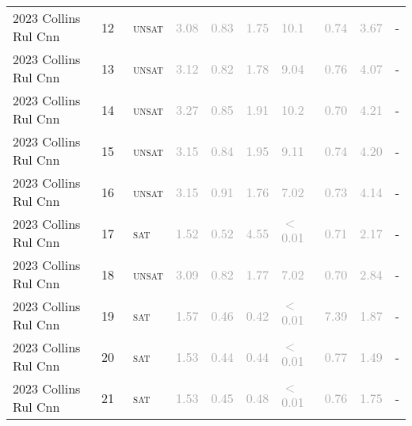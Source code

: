 \begin{center}
{\begin{longtable}{@{}llllllllll@{}}
2023 Collins Rul Cnn & 12 & ~\textsc{unsat} & \textcolor{darkgray}{3.08} & \textcolor{darkgray}{0.83} & \textcolor{darkgray}{1.75} & \textcolor{darkgray}{10.1} & \textcolor{darkgray}{0.74} & \textcolor{darkgray}{3.67} & - \\
2023 Collins Rul Cnn & 13 & ~\textsc{unsat} & \textcolor{darkgray}{3.12} & \textcolor{darkgray}{0.82} & \textcolor{darkgray}{1.78} & \textcolor{darkgray}{9.04} & \textcolor{darkgray}{0.76} & \textcolor{darkgray}{4.07} & - \\
2023 Collins Rul Cnn & 14 & ~\textsc{unsat} & \textcolor{darkgray}{3.27} & \textcolor{darkgray}{0.85} & \textcolor{darkgray}{1.91} & \textcolor{darkgray}{10.2} & \textcolor{darkgray}{0.70} & \textcolor{darkgray}{4.21} & - \\
2023 Collins Rul Cnn & 15 & ~\textsc{unsat} & \textcolor{darkgray}{3.15} & \textcolor{darkgray}{0.84} & \textcolor{darkgray}{1.95} & \textcolor{darkgray}{9.11} & \textcolor{darkgray}{0.74} & \textcolor{darkgray}{4.20} & - \\
2023 Collins Rul Cnn & 16 & ~\textsc{unsat} & \textcolor{darkgray}{3.15} & \textcolor{darkgray}{0.91} & \textcolor{darkgray}{1.76} & \textcolor{darkgray}{7.02} & \textcolor{darkgray}{0.73} & \textcolor{darkgray}{4.14} & - \\
2023 Collins Rul Cnn & 17 & ~\textsc{sat} & \textcolor{darkgray}{1.52} & \textcolor{darkgray}{0.52} & \textcolor{darkgray}{4.55} & \textcolor{darkgray}{$<$0.01} & \textcolor{darkgray}{0.71} & \textcolor{darkgray}{2.17} & - \\
2023 Collins Rul Cnn & 18 & ~\textsc{unsat} & \textcolor{darkgray}{3.09} & \textcolor{darkgray}{0.82} & \textcolor{darkgray}{1.77} & \textcolor{darkgray}{7.02} & \textcolor{darkgray}{0.70} & \textcolor{darkgray}{2.84} & - \\
2023 Collins Rul Cnn & 19 & ~\textsc{sat} & \textcolor{darkgray}{1.57} & \textcolor{darkgray}{0.46} & \textcolor{darkgray}{0.42} & \textcolor{darkgray}{$<$0.01} & \textcolor{darkgray}{7.39} & \textcolor{darkgray}{1.87} & - \\
2023 Collins Rul Cnn & 20 & ~\textsc{sat} & \textcolor{darkgray}{1.53} & \textcolor{darkgray}{0.44} & \textcolor{darkgray}{0.44} & \textcolor{darkgray}{$<$0.01} & \textcolor{darkgray}{0.77} & \textcolor{darkgray}{1.49} & - \\
2023 Collins Rul Cnn & 21 & ~\textsc{sat} & \textcolor{darkgray}{1.53} & \textcolor{darkgray}{0.45} & \textcolor{darkgray}{0.48} & \textcolor{darkgray}{$<$0.01} & \textcolor{darkgray}{0.76} & \textcolor{darkgray}{1.75} & - \\

\end{longtable}}
\end{center}
